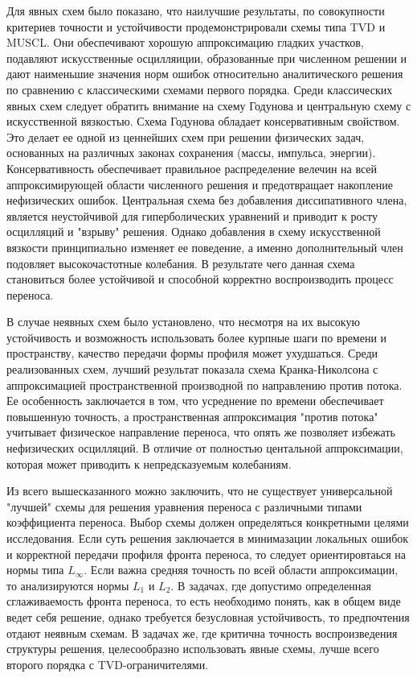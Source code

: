 \documentclass[a4paper,14pt]{extreport}
\begin{document}
Для явных схем было показано, что наилучшие результаты, по совокупности критериев точности и устойчивости продемонстрировали схемы типа TVD и MUSCL. Они обеспечивают  хорошую аппроксимацию гладких участков, подавляют искусственные осцилляиции, образованные при численном решении и дают наименьшие значения норм ошибок относительно аналитического решения по сравнению с классическими схемами первого порядка. Среди классических явных схем следует обратить внимание на схему Годунова и центральную схему с искусственной вязкостью. Схема Годунова обладает консервативным свойством. Это делает ее одной из ценнейших схем при решении физических задач, основанных на различных законах сохранения (массы, импульса, энергии). Консервативность обеспечивает правильное распределение велечин на всей аппроксимирующей области численного решения и предотвращает накопление нефизических ошибок. Центральная схема без добавления диссипативного члена, является неустойчивой для гиперболических уравнений и приводит к росту осцилляций и "взрыву" решения. Однако добавления в схему искусственной вязкости принципиально изменяет ее поведение, а именно дополнительный член подовляет высокочастотные колебания. В результате чего данная схема становиться более устойчивой и способной корректно воспроизводить процесс переноса.

В случае неявных схем было установлено, что несмотря на их высокую устойчивость и возможность использовать более курпные шаги по времени и пространству, качество передачи формы профиля может ухудшаться. Среди реализованных схем, лучший результат показала схема Кранка-Николсона с аппроксимацией пространственной производной по направлению против потока. Ее особенность заключается в том, что усреднение по времени обеспечивает повышенную точность, а пространственная аппроксимация "против потока" учитывает физическое направление переноса, что опять же позволяет избежать нефизических осцилляций. В отличие от полностью центальной аппроксимации, которая может приводить к непредсказуемым колебаниям.

Из всего вышесказанного можно заключить, что не существует универсальной "лучшей" схемы для решения уравнения переноса с различными типами коэффициента переноса. Выбор схемы должен определяться конкретными целями исследования. Если суть решения заключается в минимазации локальных ошибок и корректной передачи профиля фронта переноса, то следует ориентировтаься на нормы типа $L_\infty$. Если важна средняя точность по всей области аппроксимации, то анализируются нормы $L_1$ и $L_2$. В задачах, где допустимо определенная сглаживаемость фронта переноса, то есть необходимо понять, как в общем виде ведет себя решение, однако требуется безусловная устойчивость, то предпочтения отдают неявным схемам. В задачах же, где критична точность воспроизведения структуры решения, целесообразно использовать явные схемы, лучше всего второго порядка с TVD-ограничителями.
\end{document}
